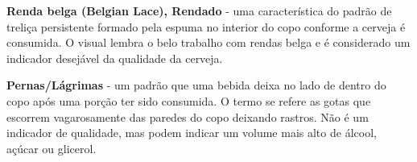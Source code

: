 \textbf{Renda belga (Belgian Lace), Rendado} - uma característica do padrão de treliça persistente formado pela espuma no interior do copo conforme a cerveja é consumida. O visual lembra o belo trabalho com rendas belga e é considerado um indicador desejável da qualidade da cerveja.

\textbf{Pernas/Lágrimas} - um padrão que uma bebida deixa no lado de dentro do copo após uma porção ter sido consumida. O termo se refere as gotas que escorrem vagarosamente das paredes do copo deixando rastros. Não é um indicador de qualidade, mas podem indicar um volume mais alto de álcool, açúcar ou glicerol.
